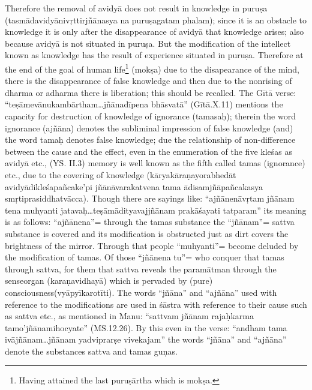Therefore the removal of avidyā does not result in knowledge in puruṣa  (tasmādavidyānivṛttirjñānasya na puruṣagatam phalam); since it is an obstacle to knowledge it is only after the disappearance of avidyā that knowledge arises; also because avidyā is not situated in puruṣa.  But the modification of the intellect known as knowledge has the result of experience situated in puruṣa. Therefore at the end of the goal of human life\footnote{Having attained the last puruṣārtha which is mokṣa.} (mokṣa) due to the disapearance of the mind, there is the disappearance of false knowledge and then due to the nonrising of dharma or adharma there is liberation; this should be recalled. The Gītā verse: “teṣāmevānukambārtham…jñānadīpena bhāsvatā” (Gītā.\-X.11) mentions the capacity for destruction of knowledge of ignorance (tamasaḥ); therein the word ignorance (ajñāna) denotes the subliminal impression of false knowledge (and) the word tamaḥ denotes false knowledge; due the relationship of non-difference between the cause and the effect, even in the enumeration of the five kleśas as avidyā etc., (YS. II.3) memory is well known as the fifth called tamas (ignorance) etc., due to the covering of knowledge   (kāryakāraṇayorabhedāt avidyādikleśapañcake’pi jñānāvarakatvena tama ādisamjñāpañcakasya smṛtiprasiddhatvācca). Though there are sayings like: “ajñānenāvṛtam jñānam tena muhyanti jatavaḥ…teṣāmādityavajjñānam prakāśayati tatparam” its meaning is as follows: “ajñānena”= through the tamas substance the “jñānam”= sattva substance is covered and its modification is obstructed just as dirt covers the brightness of the mirror.  Through that people “muhyanti”= become deluded by the modification of tamas. Of those “jñānena tu”= who conquer that tamas through sattva, for them that sattva reveals the paramātman through the sense\break organ (karaṇavidhayā) which is pervaded by (pure) consciousness\break (vyāpyīkarotīti). The words “jñāna” and “ajñāna” used with reference to the modifications are used in śāstra with reference to their cause such as sattva etc., as mentioned in Manu: “sattvam jñānam rajaḥ\break karma tamo’jñānamihocyate” (MS.12.26). By this even in the verse: “andham tama ivājñānam…jñānam yadviprarṣe vivekajam” the words “jñāna” and “ajñāna” denote the substances sattva and tamas guṇas.

\eject

